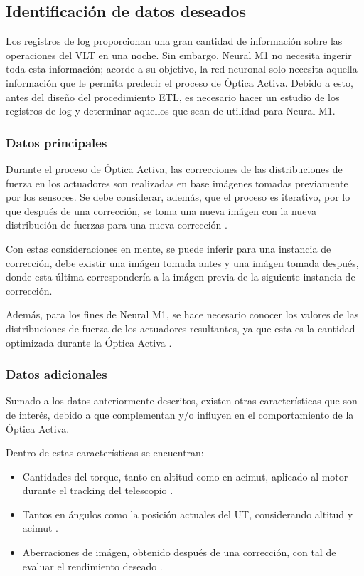 
\subsection{Identificación de datos deseados}

Los registros de log proporcionan una gran cantidad de información sobre las operaciones del VLT en una noche. Sin embargo, Neural M1 no necesita ingerir toda esta información; acorde a su objetivo, la red neuronal solo necesita aquella información que le permita predecir el proceso de Óptica Activa.
Debido a esto, antes del diseño del procedimiento ETL, es necesario hacer un estudio de los registros de log y determinar aquellos que sean de utilidad para Neural M1.

\subsubsection{Datos principales}

Durante el proceso de Óptica Activa, las correcciones de las distribuciones de fuerza en los actuadores son realizadas en base imágenes tomadas previamente por los sensores. Se debe considerar, además, que el proceso es iterativo, por lo que después de una corrección, se toma una nueva imágen con la nueva distribución de fuerzas para una nueva corrección \cite{eso1998vlt}.

Con estas consideraciones en mente, se puede inferir para una instancia de corrección, debe existir una imágen tomada antes y una imágen tomada después, donde esta última correspondería a la imágen previa de la siguiente instancia de corrección.

Además, para los fines de Neural M1, se hace necesario conocer los valores de las distribuciones de fuerza de los actuadores resultantes, ya que esta es la cantidad optimizada durante la Óptica Activa \cite{eso1998vlt}. 

\subsubsection{Datos adicionales}

Sumado a los datos anteriormente descritos, existen otras características que son de interés, debido a que complementan y/o influyen en el comportamiento de la Óptica Activa.

Dentro de estas características se encuentran:

\begin{itemize}
    \item Cantidades del torque, tanto en altitud como en acimut, aplicado al motor durante el tracking del telescopio \cite{eso1998vlt}.

    \item Tantos en ángulos como la posición actuales del UT, considerando altitud y acimut \cite{eso1998vlt}.

    \item Aberraciones de imágen, obtenido después de una corrección, con tal de evaluar el rendimiento deseado \cite{wilson1987active}.
    
\end{itemize}

